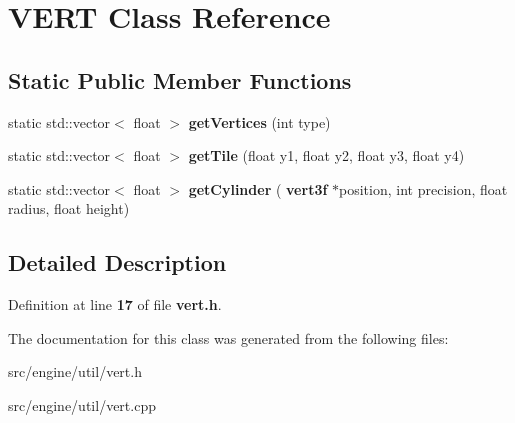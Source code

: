 \section{V\+E\+RT Class Reference}
\label{class_v_e_r_t}
\subsection*{Static Public Member Functions}
\begin{DoxyCompactItemize}
\item 
\mbox{\label{class_v_e_r_t_adf88300ab4699c6b6ab921bbd860e0d3}} 
static std\+::vector$<$ float $>$ {\bfseries get\+Vertices} (int type)
\item 
\mbox{\label{class_v_e_r_t_a10de97e729e8455008877ac555c0d7bb}} 
static std\+::vector$<$ float $>$ {\bfseries get\+Tile} (float y1, float y2, float y3, float y4)
\item 
\mbox{\label{class_v_e_r_t_ab1b5f820762d38da83dbc8b60486a8b0}} 
static std\+::vector$<$ float $>$ {\bfseries get\+Cylinder} (\textbf{ vert3f} $\ast$position, int precision, float radius, float height)
\end{DoxyCompactItemize}


\subsection{Detailed Description}


Definition at line \textbf{ 17} of file \textbf{ vert.\+h}.



The documentation for this class was generated from the following files\+:\begin{DoxyCompactItemize}
\item 
src/engine/util/vert.\+h\item 
src/engine/util/vert.\+cpp\end{DoxyCompactItemize}
